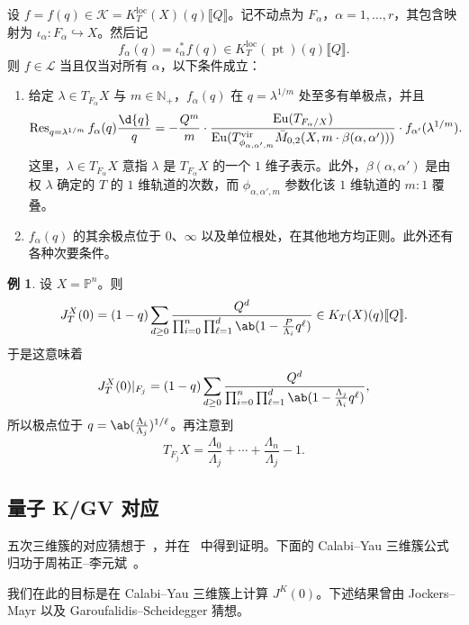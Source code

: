 \documentclass{amsart}
\theoremstyle{definition}
\newtheorem{exm}[thm]{例}
\theoremstyle{remark}
\theoremstyle{plain}
\theoremstyle{definition}
\theoremstyle{remark}
\newcommand{\N}{\mathbb{N}}
\renewcommand{\P}{\mathbb{P}}
\newcommand{\mc}[1]{\mathcal{#1}}
\newcommand{\mr}[1]{\mathrm{#1}}
\newcommand{\on}[1]{\operatorname{#1}}
\newcommand{\1}{\mathbf{1}}
\newcommand{\2}{\mathbf{2}}
\newcommand{\3}{\mathbf{3}}
\newcommand{\vir}{\mr{vir}}
\newcommand{\ps}[1]{\llbracket #1 \rrbracket}
\newcommand{\loc}{\mr{loc}}
\begin{document}
设 \(f = f(q) \in \mc{K} = K_T^{\loc}(X)(q)\ps{Q}\)。记不动点为 \(F_{\alpha}\)，\(\alpha = 1, \ldots, r\)，其包含映射为 \(\iota_{\alpha} \colon F_{\alpha} \hookrightarrow X\)。然后记
\[ f_{\alpha}(q) = \iota_{\alpha}^* f(q) \in K_T^{\loc}(\on{pt})(q)\ps{Q}. \]
则 \(f \in \mc{L}\) 当且仅当对所有 \(\alpha\)，以下条件成立：
\begin{enumerate}
    \item 给定 \(\lambda \in T_{F_{\alpha}} X\) 与 \(m \in \N_+\)，\(f_{\alpha}(q)\) 在 \(q = \lambda^{1/m}\) 处至多有单极点，并且
        \[ \on{Res}_{q = \lambda^{1/m}} f_{\alpha}(q) \frac{\d{q}}{q} = -\frac{Q^m}{m} \cdot \frac{\on{Eu}(T_{F_{\alpha}/X})}{\on{Eu}(T^{\vir}_{\phi_{\alpha,\alpha',m}}\bar{M}_{0,2}(X, m \cdot \beta(\alpha, \alpha')))} \cdot f_{\alpha'}(\lambda^{1/m}). \]
        这里，\(\lambda \in T_{F_{\alpha}}X\) 意指 \(\lambda\) 是 \(T_{F_{\alpha}} X\) 的一个 \(1\) 维子表示。此外，\(\beta(\alpha,\alpha')\) 是由权 \(\lambda\) 确定的 \(T\) 的 \(1\) 维轨道的次数，而 \(\phi_{\alpha, \alpha', m}\) 参数化该 \(1\) 维轨道的 \(m:1\) 覆叠。
    \item \(f_{\alpha}(q)\) 的其余极点位于 \(0\)、\(\infty\) 以及单位根处，在其他地方均正则。此外还有各种次要条件。
\end{enumerate}

\begin{exm}
    设 \(X = \P^n\)。则
    \[ J_T^X(0) = (1-q) \sum_{d \geq 0} \frac{Q^d}{\prod_{i=0}^n \prod_{\ell = 1}^d \ab(1 - \frac{P}{\Lambda_i} q^{\ell})} \in K_T(X)(q) \ps{Q}. \]
    于是这意味着
    \[ J_T^X(0) |_{F_j} = (1-q) \sum_{d \geq 0} \frac{Q^d}{\prod_{i=0}^n \prod_{\ell = 1}^d \ab(1 - \frac{\Lambda_j}{\Lambda_i}q^{\ell})}, \]
    所以极点位于 \(q = \ab(\frac{\Lambda_i}{\Lambda_j})^{1/\ell}\)。再注意到
    \[ T_{F_j} X = \frac{\Lambda_0}{\Lambda_j} + \cdots + \frac{\Lambda_n}{\Lambda_j} - 1. \]
\end{exm}

\subsection{量子 K/GV 对应}%
\label{sub:Quantum K/GV correspondence}

五次三维簇的对应猜想于~\cite{GaroufalidisScheidegger2022}，并在~\cite{ChouLeeQuintic} 中得到证明。下面的 Calabi–Yau 三维簇公式归功于周祐正–李元斌~\cite{ChouLee2025}。

我们在此的目标是在 Calabi–Yau 三维簇上计算 \(J^K(0)\)。下述结果曾由 Jockers–Mayr 以及 Garoufalidis–Scheidegger 猜想。
\end{document}
